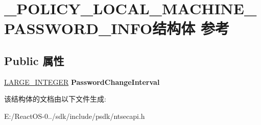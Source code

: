 \hypertarget{struct___p_o_l_i_c_y___l_o_c_a_l___m_a_c_h_i_n_e___p_a_s_s_w_o_r_d___i_n_f_o}{}\section{\+\_\+\+P\+O\+L\+I\+C\+Y\+\_\+\+L\+O\+C\+A\+L\+\_\+\+M\+A\+C\+H\+I\+N\+E\+\_\+\+P\+A\+S\+S\+W\+O\+R\+D\+\_\+\+I\+N\+F\+O结构体 参考}
\label{struct___p_o_l_i_c_y___l_o_c_a_l___m_a_c_h_i_n_e___p_a_s_s_w_o_r_d___i_n_f_o}
\subsection*{Public 属性}
\begin{DoxyCompactItemize}
\item 
\mbox{\label{struct___p_o_l_i_c_y___l_o_c_a_l___m_a_c_h_i_n_e___p_a_s_s_w_o_r_d___i_n_f_o_a269b66b7cab3b5f613e45a1eb3174fa9}} 
\hyperlink{union___l_a_r_g_e___i_n_t_e_g_e_r}{L\+A\+R\+G\+E\+\_\+\+I\+N\+T\+E\+G\+ER} {\bfseries Password\+Change\+Interval}
\end{DoxyCompactItemize}


该结构体的文档由以下文件生成\+:\begin{DoxyCompactItemize}
\item 
E\+:/\+React\+O\+S-\/0../sdk/include/psdk/ntsecapi.\+h\end{DoxyCompactItemize}
